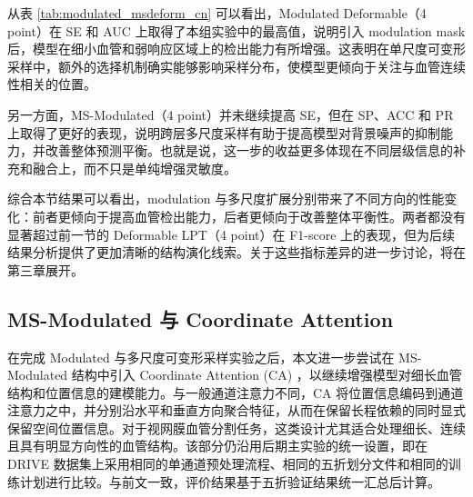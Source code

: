 \documentclass[a4paper,12pt]{article}
\begin{document}
\begin{table}[htbp]
\centering
\caption{Modulated 与多尺度可变形 LPT 实验结果对比}
\label{tab:modulated_msdeform_cn}
\end{table}

从表 \ref{tab:modulated_msdeform_cn} 可以看出，Modulated Deformable（4 point）在 SE 和 AUC 上取得了本组实验中的最高值，说明引入 modulation mask 后，模型在细小血管和弱响应区域上的检出能力有所增强。这表明在单尺度可变形采样中，额外的选择机制确实能够影响采样分布，使模型更倾向于关注与血管连续性相关的位置。

另一方面，MS-Modulated（4 point）并未继续提高 SE，但在 SP、ACC 和 PR 上取得了更好的表现，说明跨层多尺度采样有助于提高模型对背景噪声的抑制能力，并改善整体预测平衡。也就是说，这一步的收益更多体现在不同层级信息的补充和融合上，而不只是单纯增强灵敏度。

综合本节结果可以看出，modulation 与多尺度扩展分别带来了不同方向的性能变化：前者更倾向于提高血管检出能力，后者更倾向于改善整体平衡性。两者都没有显著超过前一节的 Deformable LPT（4 point）在 F1-score 上的表现，但为后续结果分析提供了更加清晰的结构演化线索。关于这些指标差异的进一步讨论，将在第三章展开。

\subsection{MS-Modulated 与 Coordinate Attention}

在完成 Modulated 与多尺度可变形采样实验之后，本文进一步尝试在 MS-Modulated 结构中引入 Coordinate Attention (CA) \cite{hou2021coordatt}，以继续增强模型对细长血管结构和位置信息的建模能力。与一般通道注意力不同，CA 将位置信息编码到通道注意力之中，并分别沿水平和垂直方向聚合特征，从而在保留长程依赖的同时显式保留空间位置信息。对于视网膜血管分割任务，这类设计尤其适合处理细长、连续且具有明显方向性的血管结构。该部分仍沿用后期主实验的统一设置，即在 DRIVE 数据集上采用相同的单通道预处理流程、相同的五折划分文件和相同的训练计划进行比较。与前文一致，评价结果基于五折验证结果统一汇总后计算。
\end{document}
